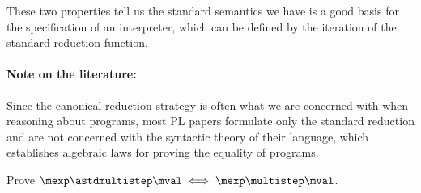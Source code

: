 These two properties tell us the standard semantics we have is a good
basis for the specification of an interpreter, which can be defined by
the iteration of the standard reduction function.

\paragraph{Note on the literature:} Since the canonical reduction strategy
is often what we are concerned with when reasoning about programs,
most PL papers formulate only the standard reduction and are not
concerned with the syntactic theory of their language, which establishes
algebraic laws for proving the equality of programs.

\begin{exercise}
Prove $\mexp\astdmultistep\mval \iff \mexp \multistep \mval$.
\end{exercise}


